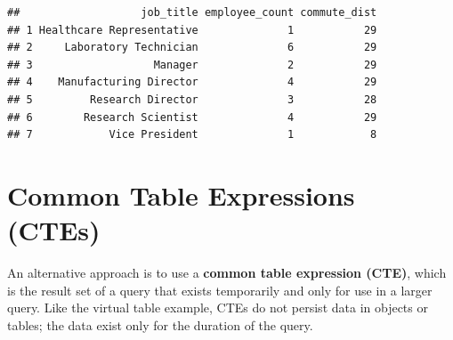 \documentclass[
]{book}
\begin{document}
\begin{verbatim}
##                   job_title employee_count commute_dist
## 1 Healthcare Representative              1           29
## 2     Laboratory Technician              6           29
## 3                   Manager              2           29
## 4    Manufacturing Director              4           29
## 5         Research Director              3           28
## 6        Research Scientist              4           29
## 7            Vice President              1            8
\end{verbatim}

\hypertarget{common-table-expressions-ctes}{%
\section{Common Table Expressions (CTEs)}\label{common-table-expressions-ctes}}

An alternative approach is to use a \textbf{common table expression (CTE)}, which is the result set of a query that exists temporarily and only for use in a larger query. Like the virtual table example, CTEs do not persist data in objects or tables; the data exist only for the duration of the query.
\end{document}
